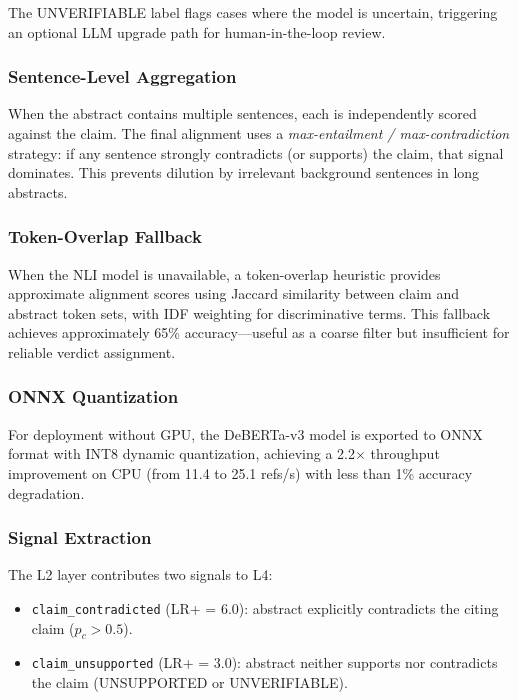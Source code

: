 \documentclass[sigconf,nonacm]{acmart}
\begin{document}
The UNVERIFIABLE label flags cases where the model is uncertain, triggering an optional LLM upgrade path for human-in-the-loop review.

\subsubsection{Sentence-Level Aggregation}

When the abstract contains multiple sentences, each is independently scored against the claim.
The final alignment uses a \emph{max-entailment / max-contradiction} strategy: if any sentence strongly contradicts (or supports) the claim, that signal dominates.
This prevents dilution by irrelevant background sentences in long abstracts.

\subsubsection{Token-Overlap Fallback}

When the NLI model is unavailable, a token-overlap heuristic provides approximate alignment scores using Jaccard similarity between claim and abstract token sets, with IDF weighting for discriminative terms.
This fallback achieves approximately 65\% accuracy---useful as a coarse filter but insufficient for reliable verdict assignment.

\subsubsection{ONNX Quantization}

For deployment without GPU, the DeBERTa-v3 model is exported to ONNX format with INT8 dynamic quantization, achieving a 2.2$\times$ throughput improvement on CPU (from 11.4 to 25.1 refs/s) with less than 1\% accuracy degradation.

\subsubsection{Signal Extraction}

The L2 layer contributes two signals to L4:
\begin{itemize}[leftmargin=*]
    \item \texttt{claim\_contradicted} (LR+ = 6.0): abstract explicitly contradicts the citing claim ($p_c > 0.5$).
    \item \texttt{claim\_unsupported} (LR+ = 3.0): abstract neither supports nor contradicts the claim (UNSUPPORTED or UNVERIFIABLE).
\end{itemize}
\end{document}
